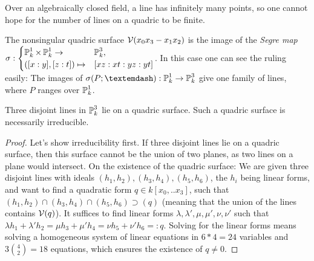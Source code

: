 \begin{remark}
Over an algebraically closed field, a line has infinitely many points, so one cannot hope for the number of lines on a quadric to be finite.
\end{remark}

\begin{remark}
The nonsingular quadric surface $\operatorname{\mathcal V}(x_0x_3 - x_1x_2)$ is the image of the \emph{Segre map} $\sigma : \begin{cases} \operatorname{\mathbb P}^1_k \times \operatorname{\mathbb P}^1_k \to& \operatorname{\mathbb P}^3_k,  \\ ([x:y],[z:t]) \mapsto& [xz:xt:yz:yt] \end{cases}$.
In this case one can see the ruling easily: The images of
$\sigma(P;\textemdash) : \proj^1_k \to \proj^3_k$ give one family of lines, where $P$ ranges over $\operatorname{\mathbb P}^1_k$.
\end{remark}


\begin{lemma} \label{lemmaThreeLines}
Three disjoint lines in $\operatorname{\mathbb P}^3_k$ lie on a quadric surface.
Such a quadric surface is necessarily irreducible.
\end{lemma}
\begin{proof}
Let's show irreducibility first.
If three disjoint lines lie on a quadric surface, then this surface cannot be the union of two planes, as two lines on a plane would intersect.
On the existence of the quadric surface:
We are given three disjoint lines with ideals $(h_1,h_2), (h_3,h_4), (h_5,h_6)$, the $h_i$ being linear forms, and want to find a quadratic form $q \in k[x_0,..x_3]$, such that $(h_1,h_2) \cap (h_3,h_4) \cap (h_5,h_6) \supset (q)$ (meaning that the union of the lines contains $\operatorname{\mathcal V}(q)$).
It suffices to find linear forms $\lambda,\lambda',\mu,\mu',\nu,\nu'$ such that
$\lambda h_1 + \lambda' h_2 = \mu h_3 + \mu' h_4 = \nu h_5 + \nu' h_6 =: q$.
Solving for the linear forms means solving a homogeneous system of linear equations in $6*4= 24$ variables and $3\binom{4}{2} = 18$ equations, which ensures the existence of $q \neq 0$.
\end{proof}

